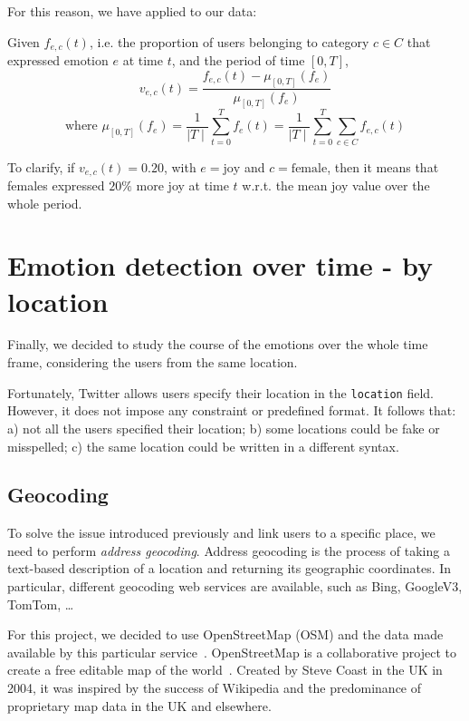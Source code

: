 For this reason, we have applied  to our data:
	
\begin{definition}
\label{def:categories-normalization}
	Given \(f_{e, c}(t)\), i.e. the proportion of users belonging to category \(c \in C\) that expressed emotion \(e\) at time \(t\), and the period of time \([0,T]\),
	\[v_{e, c}(t) = \frac{f_{e, c}(t) - \mu_{[0,T]}(f_e)}{\mu_{[0,T]}(f_e)}\]
	\[\text{where } \mu_{[0,T]}(f_e) = \frac{1}{\mid T \mid} \sum_{t =0}^{T} f_e(t) = \frac{1}{\mid T \mid} \sum_{t =0}^{T} \sum_{c \in C} f_{e, c}(t)\] 
\end{definition}

To clarify, if \(v_{e, c}(t) = 0.20\), with \(e = \text{joy}\) and \(c = \text{female}\), then it means that females expressed \(20\%\) more joy at time \(t\) w.r.t. the mean joy value over the whole period.

\section{Emotion detection over time - by location}
\label{sec:emotion-by-location}

Finally, we decided to study the course of the emotions over the whole time frame, considering the users from the same location.

Fortunately, Twitter allows users specify their location in the \texttt{location} field. However, it does not impose any constraint or predefined format. It follows that: a) not all the users specified their location; b) some locations could be fake or misspelled; c) the same location could be written in a different syntax.

\subsection{Geocoding}
\label{subsec:geocoding}

To solve the issue introduced previously and link users to a specific place, we need to perform \textit{address geocoding}. Address geocoding is the process of taking a text-based description of a location and returning its geographic coordinates. In particular, different geocoding web services are available, such as Bing, GoogleV3, TomTom, \ldots

For this project, we decided to use OpenStreetMap (OSM) and the data made available by this particular service~\cite{osm}. OpenStreetMap is a collaborative project to create a free editable map of the world~\cite{enwiki:1028995235}. Created by Steve Coast in the UK in 2004, it was inspired by the success of Wikipedia and the predominance of proprietary map data in the UK and elsewhere.

